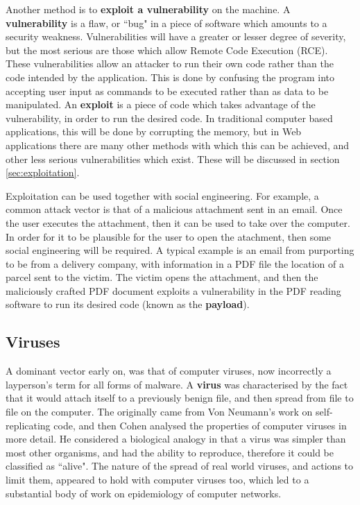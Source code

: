 \documentclass{acm_proc_article-sp}
\begin{document}
Another method is to \textbf{exploit a vulnerability} on the machine.  A \textbf{vulnerability} is a flaw, or ``bug" in a piece of software which amounts to a security weakness.  Vulnerabilities will have a greater or lesser degree of severity, but the most serious are those which allow Remote Code Execution (RCE).  These vulnerabilities allow an attacker to run their own code rather than the code intended by the application.  This is done by confusing the program into accepting user input as commands to be executed rather than as data to be manipulated.  An \textbf{exploit} is a piece of code which takes advantage of the vulnerability, in order to run the desired code.  In traditional computer based applications, this will be done by corrupting the memory, but in Web applications there are many other methods with which this can be achieved, and other less serious vulnerabilities which exist.  These will be discussed in section \ref{sec:exploitation}.  

Exploitation can be used together with social engineering.  For example, a common attack vector is that of a malicious attachment sent in an email.  Once the user executes the attachment, then it can be used to take over the computer.  In order for it to be plausible for the user to open the atachment, then some social engineering will be required.  A typical example is an email from purporting to be from a delivery company, with information in a PDF file the location of a parcel sent to the victim.  The victim opens the attachment, and then the maliciously crafted PDF document exploits a vulnerability in the PDF reading software to run its desired code (known as the \textbf{payload}).

\subsection{Viruses}
A dominant vector early on, was that of computer viruses, now incorrectly a layperson's term for all forms of malware.  A \textbf{virus} was characterised by the fact that it would attach itself to a previously benign file, and then spread from file to file on the computer.  The originally came from Von Neumann's work on self-replicating code, and then Cohen analysed the properties of computer viruses in more detail.  He considered a biological analogy in that a virus was simpler than most other organisms, and had the ability to reproduce, therefore it could be classified as ``alive"\cite{cohen}.  The nature of the spread of real world viruses, and actions to limit them, appeared to hold with computer viruses too\cite{murray1988}, which led to a substantial body of work on epidemiology of computer networks.
\end{document}
